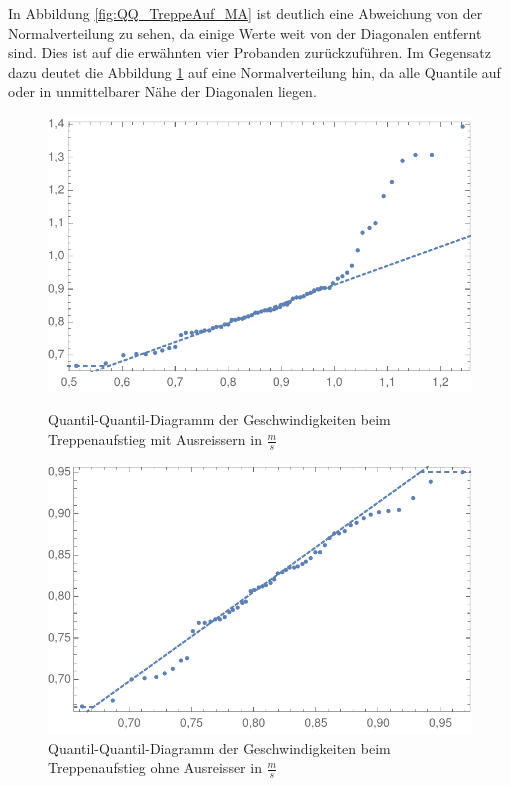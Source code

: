 In Abbildung \ref{fig:QQ_TreppeAuf_MA} ist deutlich eine Abweichung von der Normalverteilung zu sehen, da einige Werte weit von der Diagonalen entfernt sind. Dies ist auf die erwähnten vier Probanden zurückzuführen. Im Gegensatz dazu deutet die Abbildung \ref{fig:QQ_TreppeAuf_OA} auf eine Normalverteilung hin, da alle Quantile auf oder in unmittelbarer Nähe der Diagonalen liegen.
\begin{figure}[!htb]
    \centering
    \begin{minipage}{.5\textwidth}
        \centering
        \includegraphics[width=\textwidth]{abbildungen/QQ_Plot_2017_TreppeAuf_MitAusreisser.pdf}
        \caption{Quantil-Quantil-Diagramm der Geschwindigkeiten beim Treppenaufstieg mit Ausreissern in $\frac{m}{s}$}
        \label{fig:QQ_TreppeAuf_MA}
    \end{minipage}%
    \begin{minipage}{0.5\textwidth}
        \centering
        \includegraphics[width=\textwidth]{abbildungen/QQ_Plot_2017_TreppeAuf_OhneAusreisser.pdf}
        \caption{Quantil-Quantil-Diagramm der Geschwindigkeiten beim Treppenaufstieg ohne Ausreisser in $\frac{m}{s}$}
        \label{fig:QQ_TreppeAuf_OA}
    \end{minipage}
\end{figure}


